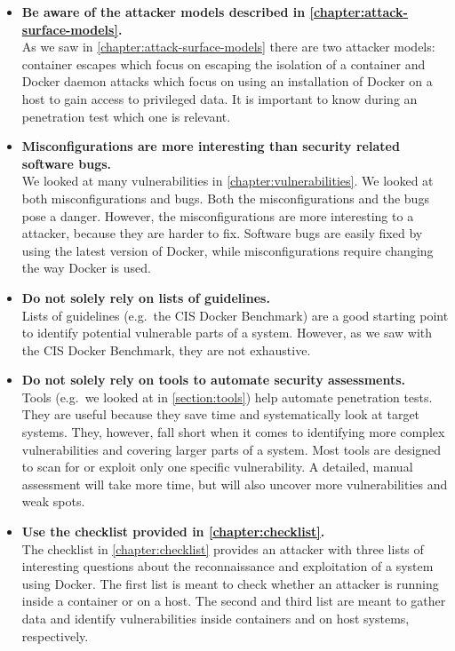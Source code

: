 \begin{itemize}
    \item \textbf{Be aware of the attacker models described in \autoref{chapter:attack-surface-models}.}\\
        As we saw in \autoref{chapter:attack-surface-models} there are two attacker models: container escapes which focus on escaping the isolation of a container and Docker daemon attacks which focus on using an installation of Docker on a host to gain access to privileged data. It is important to know during an penetration test which one is relevant.

    \item \textbf{Misconfigurations are more interesting than security related software bugs.}\\
        We looked at many vulnerabilities in \autoref{chapter:vulnerabilities}. We looked at both misconfigurations and bugs. Both the misconfigurations and the bugs pose a danger. However, the misconfigurations are more interesting to a attacker, because they are harder to fix. Software bugs are easily fixed by using the latest version of Docker, while misconfigurations require changing the way Docker is used.

    \item \textbf{Do not solely rely on lists of guidelines.}\\
        Lists of guidelines (e.g.\ the CIS Docker Benchmark) are a good starting point to identify potential vulnerable parts of a system. However, as we saw with the CIS Docker Benchmark, they are not exhaustive.

    \item \textbf{Do not solely rely on tools to automate security assessments.}\\
        Tools (e.g.\ we looked at in \autoref{section:tools}) help automate penetration tests. They are useful because they save time and systematically look at target systems. They, however, fall short when it comes to identifying more complex vulnerabilities and covering larger parts of a system. Most tools are designed to scan for or exploit only one specific vulnerability. A detailed, manual assessment will take more time, but will also uncover more vulnerabilities and weak spots.

    \item \textbf{Use the checklist provided in \autoref{chapter:checklist}.}\\
        The checklist in \autoref{chapter:checklist} provides an attacker with three lists of interesting questions about the reconnaissance and exploitation of a system using Docker. The first list is meant to check whether an attacker is running inside a container or on a host. The second and third list are meant to gather data and identify vulnerabilities inside containers and on host systems, respectively.
\end{itemize}

